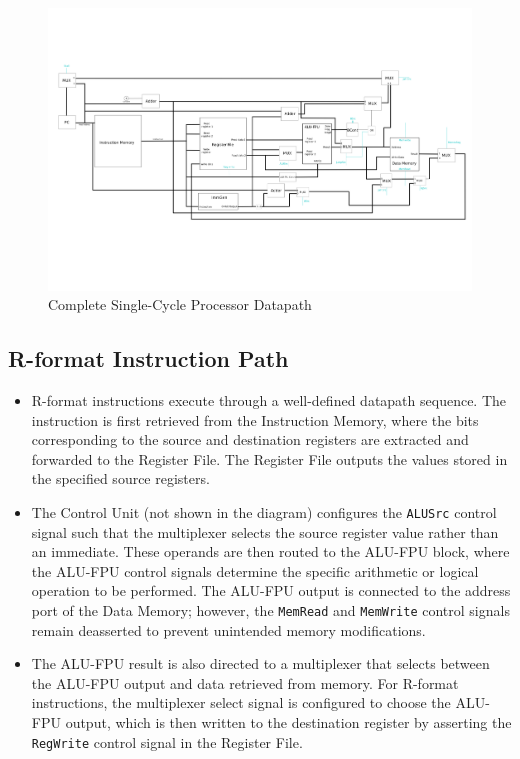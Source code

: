 \documentclass{article}
\begin{document}
\begin{figure}[H]
    \centering
    \includegraphics[width=\linewidth]{datapath.png}
    \caption{Complete Single-Cycle Processor Datapath}
    \label{fig:datapath}
\end{figure}

\subsection*{R-format Instruction Path}

\begin{itemize}
    \item R-format instructions execute through a well-defined datapath sequence. The instruction is first retrieved from the Instruction Memory, where the bits corresponding to the source and destination registers are extracted and forwarded to the Register File. The Register File outputs the values stored in the specified source registers.

    \item The Control Unit (not shown in the diagram) configures the \texttt{ALUSrc} control signal such that the multiplexer selects the source register value rather than an immediate. These operands are then routed to the ALU-FPU block, where the ALU-FPU control signals determine the specific arithmetic or logical operation to be performed. The ALU-FPU output is connected to the address port of the Data Memory; however, the \texttt{MemRead} and \texttt{MemWrite} control signals remain deasserted to prevent unintended memory modifications.

    \item The ALU-FPU result is also directed to a multiplexer that selects between the ALU-FPU output and data retrieved from memory. For R-format instructions, the multiplexer select signal is configured to choose the ALU-FPU output, which is then written to the destination register by asserting the \texttt{RegWrite} control signal in the Register File.
\end{itemize}
\end{document}
